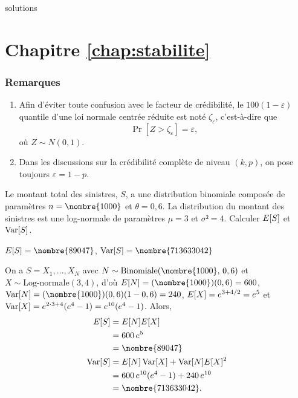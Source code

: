 \begin{Filesave}{solutions}
\section*{Chapitre \ref*{chap:stabilite}}

\subsubsection*{Remarques}
\begin{enumerate}
  \item Afin d'éviter toute confusion avec le facteur de crédibilité,
    le $100(1 - \varepsilon)${\ieme} quantile d'une loi normale
    centrée réduite est noté $\zeta_\varepsilon$, c'est-à-dire que
    \begin{displaymath}
      \Pr[Z > \zeta_\varepsilon] = \varepsilon,
    \end{displaymath}
    où $Z \sim N(0, 1)$.
  \item Dans les discussions sur la crédibilité complète de niveau
    $(k, p)$, on pose toujours $\varepsilon = 1 - p$.
  \end{enumerate}
\bigskip

\end{Filesave}

\begin{exercice}
  Le montant total des sinistres, $S$, a une distribution binomiale
  composée de paramètres $n = \nombre{1000}$ et $\theta = 0,6$. La
  distribution du montant des sinistres est une log-normale de
  paramètres $\mu = 3$ et $\sigma² = 4$. Calculer $E [ S ]$ et
  $\operatorname{Var} [ S ]$.
  \begin{rep}
    $\esp{S} = \nombre{89047}$, $\var{S} = \nombre{713633042}$
  \end{rep}
  \begin{sol}
    On a $S = X_1, \dots, X_N$ avec
    $N \sim \text{Binomiale}(\nombre{1000},\, 0,6)$ et
    $X \sim \text{Log-normale}(3, 4)$, d'où
    $\esp{N} = (\nombre{1000})(0,6) = 600$,
    $\var{N} = (\nombre{1000})(0,6)(1 - 0,6) = 240$,
    $E [ X ] = e^{3 + 4/2} = e^5$ et
    $\operatorname{Var} [ X ] = e^{2 \cdot 3 + 4}(e^4 - 1) = e^{10}(e^4 - 1)$.
    Alors,
    \begin{align*}
      \esp{S}
      &= \esp{N} \esp{X} \\
      &= 600\, e^5 \\
      &= \nombre{89047} \\
      \var{S}
      &= \esp{N} \var{X} + \var{N} \esp{X}^2 \\
      &= 600\, e^{10}(e^4 - 1) + 240\, e^{10} \\
      &= \nombre{713633042}.
    \end{align*}
  \end{sol}
\end{exercice}

